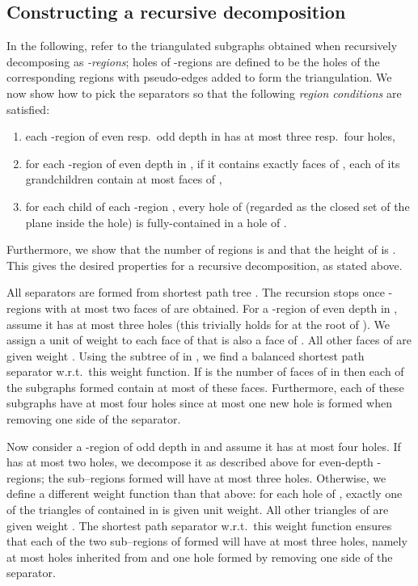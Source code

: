 \documentclass[11pt]{article}
\begin{document}
\subsection{Constructing a recursive decomposition}\label{subsec:ConstructRecDecomp}
In the following, refer to the triangulated subgraphs obtained when recursively decomposing  as \emph{-regions}; holes of -regions are defined to be the holes of the corresponding regions with pseudo-edges added to form the triangulation. We now show how to pick the separators so that the following \emph{region conditions} are satisfied:
\begin{enumerate}
\item each -region of even resp.~odd depth in  has at most three resp.~four holes,
\item for each -region of even depth in , if it contains exactly  faces of , each of its grandchildren contain at most  faces of ,
\item for each child  of each -region , every hole of  (regarded as the closed set of the plane inside the hole) is fully-contained in a hole of .
\end{enumerate}
Furthermore, we show that the number of regions is  and that the height of  is . This gives the desired properties for a recursive decomposition, as stated above.

All separators are formed from shortest path tree . The recursion stops once -regions with at most two faces of  are obtained. For a -region  of even depth in , assume it has at most three holes (this trivially holds for  at the root of ). We assign a unit of weight to each face of  that is also a face of . All other faces of  are given weight . Using the subtree of  in , we find a balanced shortest path separator w.r.t.~this weight function. If  is the number of faces of  in  then each of the subgraphs formed contain at most  of these faces. Furthermore, each of these subgraphs have at most four holes since at most one new hole is formed when removing one side of the separator.

Now consider a -region  of odd depth in  and assume it has at most four holes. If  has at most two holes, we decompose it as described above for even-depth -regions; the sub--regions formed will have at most three holes. Otherwise, we define a different weight function than that above: for each hole  of , exactly one of the triangles of  contained in  is given unit weight. All other triangles of  are given weight . The shortest path separator w.r.t.~this weight function ensures that each of the two sub--regions of  formed will have at most three holes, namely at most  holes inherited from  and one hole formed by removing one side of the separator.
\end{document}
